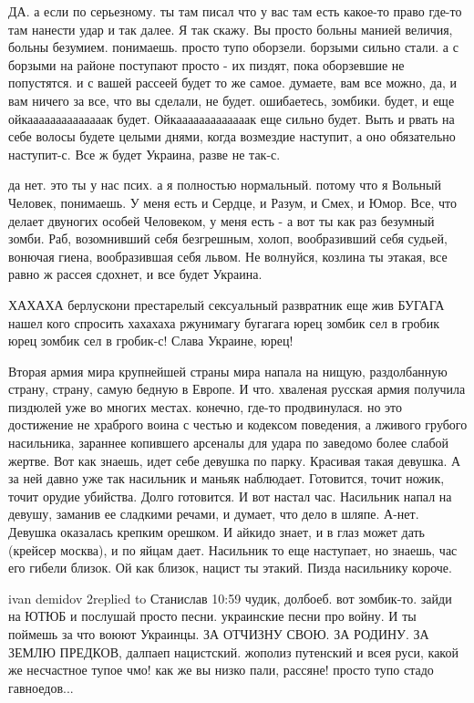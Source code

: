 ДА. а если по серьезному. ты там писал что у вас там есть какое-то право где-то
там нанести удар и так далее. Я так скажу. Вы просто больны манией величия,
больны безумием. понимаешь. просто тупо оборзели. борзыми сильно стали. а с
борзыми на районе поступают просто - их пиздят, пока оборзевшие не попустятся.
и с вашей рассеей будет то же самое. думаете, вам все можно, да, и вам ничего
за все, что вы сделали, не будет. ошибаетесь, зомбики. будет, и еще
ойкаааааааааааааак будет. Ойкааааааааааааак еще сильно будет. Выть и рвать на
себе волосы будете целыми днями, когда возмездие наступит, а оно обязательно
наступит-с. Все ж будет Украина, разве не так-с.

да нет. это ты у нас псих. а я полностью нормальный. потому что я Вольный
Человек, понимаешь. У меня есть и Сердце, и Разум, и Смех, и Юмор. Все, что
делает двуногих особей Человеком, у меня есть - а вот ты как раз безумный
зомби. Раб, возомнивший себя безгрешным, холоп, вообразивший себя судьей,
вонючая гиена, вообразившая себя львом. Не волнуйся, козлина ты этакая, все
равно ж рассея сдохнет, и все будет Украина.

ХАХАХА берлускони престарелый сексуальный развратник еще жив БУГАГА нашел кого
спросить хахахаха ржунимагу бугагага юрец зомбик сел в гробик юрец зомбик сел в
гробик-с! Слава Украине, юрец!

Вторая армия мира крупнейшей страны мира напала на нищую, раздолбанную страну,
страну, самую бедную в Европе. И что. хваленая русская армия получила пиздюлей
уже во многих местах. конечно, где-то продвинулася. но это достижение не
храброго воина с честью и кодексом поведения, а лживого грубого насильника,
зараннее копившего арсеналы для удара по заведомо более слабой жертве. Вот как
знаешь, идет себе девушка по парку. Красивая такая девушка. А за ней давно уже
так насильник и маньяк наблюдает. Готовится, точит ножик, точит орудие
убийства. Долго готовится. И вот настал час. Насильник напал на девушу, заманив
ее сладкими речами, и думает, что дело в шляпе. А-нет. Девушка оказалась
крепким орешком. И айкидо знает, и в глаз может дать (крейсер москва), и по
яйцам дает. Насильник то еще наступает, но знаешь, час его гибели близок. Ой
как близок, нацист ты этакий. Пизда насильнику короче.

ivan demidov 2replied to Станислав 10:59 чудик, долбоеб. вот зомбик-то. зайди
на ЮТЮБ и послушай просто песни. украинские песни про войну. И ты поймешь за
что воюют Украинцы. ЗА ОТЧИЗНУ СВОЮ. ЗА РОДИНУ. ЗА ЗЕМЛЮ ПРЕДКОВ, далпаеп
нацистский. жополиз путенский и всея руси, какой же несчастное тупое чмо! как
же вы низко пали, рассяне! просто тупо стадо гавноедов...

